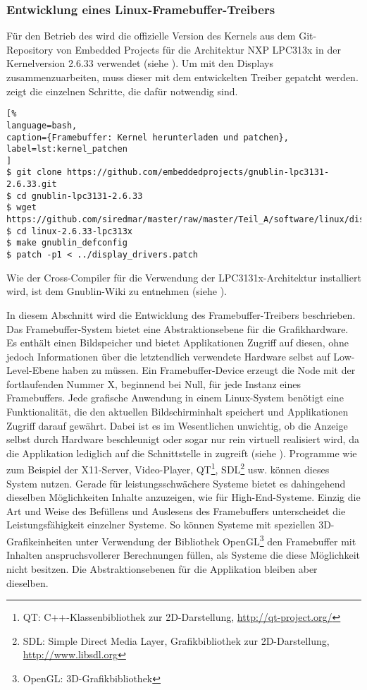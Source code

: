 \subsubsection{Entwicklung eines Linux-Framebuffer-Treibers}
Für den Betrieb des  wird die offizielle Version des Kernels aus dem Git-Repository von Embedded Projects für die Architektur NXP LPC313x in der Kernelversion 2.6.33 verwendet (siehe \cite{GnublinWiki2013b}). Um mit den Displays zusammenzuarbeiten, muss dieser mit dem entwickelten Treiber gepatcht werden.  zeigt die einzelnen Schritte, die dafür notwendig sind.

\begin{lstlisting}[%
language=bash,
caption={Framebuffer: Kernel herunterladen und patchen},
label=lst:kernel_patchen
]
$ git clone https://github.com/embeddedprojects/gnublin-lpc3131-2.6.33.git
$ cd gnublin-lpc3131-2.6.33
$ wget https://github.com/siredmar/master/raw/master/Teil_A/software/linux/display_drivers.patch
$ cd linux-2.6.33-lpc313x
$ make gnublin_defconfig
$ patch -p1 < ../display_drivers.patch
\end{lstlisting}
Wie der Cross-Compiler für die Verwendung der LPC3131x-Architektur installiert wird, ist dem Gnublin-Wiki zu entnehmen (siehe \cite{GnublinWiki2013c}).

In diesem Abschnitt wird die Entwicklung des Framebuffer-Treibers beschrieben. Das Framebuffer-System bietet eine Abstraktionsebene für die Grafikhardware. Es enthält einen Bildspeicher und bietet Applikationen Zugriff auf diesen, ohne jedoch Informationen über die letztendlich verwendete Hardware selbst auf Low-Level-Ebene haben zu müssen. Ein Framebuffer-Device erzeugt die Node  mit der fortlaufenden Nummer X, beginnend bei Null, für jede Instanz eines Framebuffers. Jede grafische Anwendung in einem Linux-System benötigt eine Funktionalität, die den aktuellen Bildschirminhalt speichert und Applikationen Zugriff darauf gewährt. Dabei ist es im Wesentlichen unwichtig, ob die Anzeige selbst durch Hardware beschleunigt oder sogar nur rein virtuell realisiert wird, da die Applikation lediglich auf die Schnittstelle in  zugreift (siehe  \cite{LinuxKernelFB}).
Programme wie zum Beispiel der X11-Server, Video-Player, QT\footnote{QT: C++-Klassenbibliothek zur 2D-Darstellung, \url{http://qt-project.org/}}, SDL\footnote{SDL: Simple Direct Media Layer, Grafikbibliothek zur 2D-Darstellung, \url{http://www.libsdl.org}} usw. können dieses System nutzen. Gerade für leistungsschwächere Systeme bietet es dahingehend dieselben Möglichkeiten Inhalte anzuzeigen, wie für High-End-Systeme. Einzig die Art und Weise des Befüllens und Auslesens des Framebuffers unterscheidet die Leistungsfähigkeit einzelner Systeme. So können Systeme mit speziellen 3D-Grafikeinheiten unter Verwendung der Bibliothek OpenGL\footnote{OpenGL: 3D-Grafikbibliothek} den Framebuffer mit Inhalten anspruchsvollerer Berechnungen füllen, als Systeme die diese Möglichkeit nicht besitzen. Die Abstraktionsebenen für die Applikation bleiben aber dieselben. 

